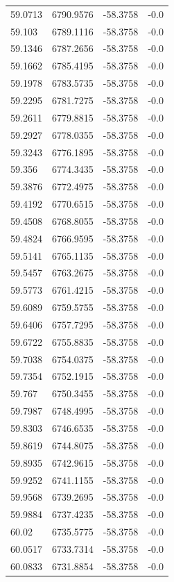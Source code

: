 \begin{table}[H]
\begin{tabular}{llll}
59.0713 & 6790.9576 & -58.3758 & -0.0 \\
59.103 & 6789.1116 & -58.3758 & -0.0 \\
59.1346 & 6787.2656 & -58.3758 & -0.0 \\
59.1662 & 6785.4195 & -58.3758 & -0.0 \\
59.1978 & 6783.5735 & -58.3758 & -0.0 \\
59.2295 & 6781.7275 & -58.3758 & -0.0 \\
59.2611 & 6779.8815 & -58.3758 & -0.0 \\
59.2927 & 6778.0355 & -58.3758 & -0.0 \\
59.3243 & 6776.1895 & -58.3758 & -0.0 \\
59.356 & 6774.3435 & -58.3758 & -0.0 \\
59.3876 & 6772.4975 & -58.3758 & -0.0 \\
59.4192 & 6770.6515 & -58.3758 & -0.0 \\
59.4508 & 6768.8055 & -58.3758 & -0.0 \\
59.4824 & 6766.9595 & -58.3758 & -0.0 \\
59.5141 & 6765.1135 & -58.3758 & -0.0 \\
59.5457 & 6763.2675 & -58.3758 & -0.0 \\
59.5773 & 6761.4215 & -58.3758 & -0.0 \\
59.6089 & 6759.5755 & -58.3758 & -0.0 \\
59.6406 & 6757.7295 & -58.3758 & -0.0 \\
59.6722 & 6755.8835 & -58.3758 & -0.0 \\
59.7038 & 6754.0375 & -58.3758 & -0.0 \\
59.7354 & 6752.1915 & -58.3758 & -0.0 \\
59.767 & 6750.3455 & -58.3758 & -0.0 \\
59.7987 & 6748.4995 & -58.3758 & -0.0 \\
59.8303 & 6746.6535 & -58.3758 & -0.0 \\
59.8619 & 6744.8075 & -58.3758 & -0.0 \\
59.8935 & 6742.9615 & -58.3758 & -0.0 \\
59.9252 & 6741.1155 & -58.3758 & -0.0 \\
59.9568 & 6739.2695 & -58.3758 & -0.0 \\
59.9884 & 6737.4235 & -58.3758 & -0.0 \\
60.02 & 6735.5775 & -58.3758 & -0.0 \\
60.0517 & 6733.7314 & -58.3758 & -0.0 \\
60.0833 & 6731.8854 & -58.3758 & -0.0 \\

\end{tabular}
\end{table}
